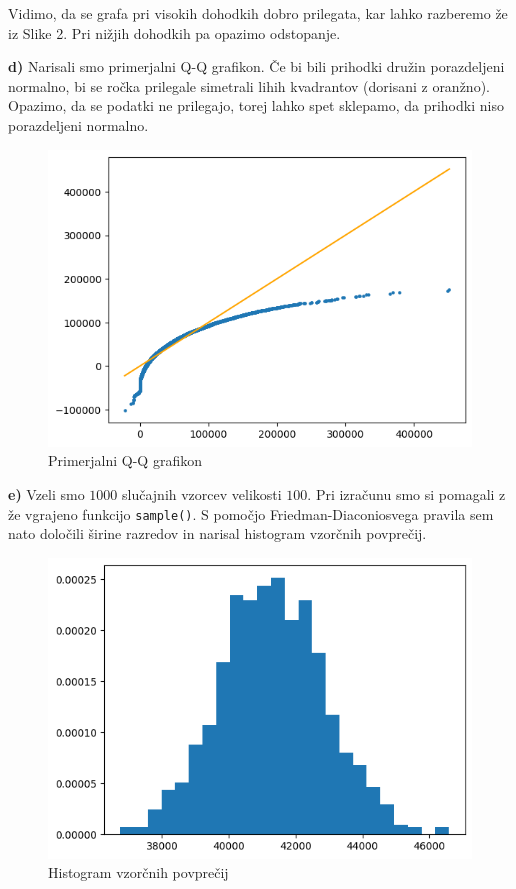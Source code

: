 \documentclass[a4paper,11pt]{article}
\begin{document}
\noindent Vidimo, da se grafa pri visokih dohodkih dobro prilegata, kar lahko razberemo že iz Slike 2. Pri nižjih dohodkih pa opazimo odstopanje.
\newline


\noindent
\textbf{d)} Narisali smo primerjalni Q-Q grafikon. Če bi bili prihodki družin porazdeljeni normalno, bi se ročka prilegale simetrali lihih kvadrantov (dorisani z oranžno). Opazimo, da se podatki ne prilegajo, torej lahko spet sklepamo, da prihodki niso porazdeljeni normalno.
\newline

\begin{figure}[H]
    \centering
    \includegraphics[scale = 0.5]{slike1/1_4.png}
    \caption{Primerjalni Q-Q grafikon}
\end{figure}

\noindent
\textbf{e)} Vzeli smo $1000$ slučajnih vzorcev velikosti $100$. Pri izračunu smo si pomagali z že vgrajeno funkcijo \texttt{sample()}. S pomočjo Friedman-Diaconiosvega pravila sem nato določili širine razredov in narisal histogram vzorčnih povprečij.
\newline

\begin{figure}[H]
    \centering
    \includegraphics[scale = 0.5]{slike1/1_5.png}
    \caption{Histogram vzorčnih povprečij}
\end{figure}
\end{document}
